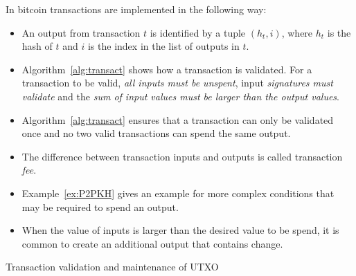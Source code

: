 \begin{note}
	\label{bitcoin:transactions}
	In bitcoin transactions are implemented in the following way:
	\begin{itemize}
		\item An output from transaction $t$ is identified by a tuple $(h_t,i)$,
		where $h_t$ is the hash of $t$ and $i$ is the index in the list of outputs in $t$.
		\item Algorithm~\ref{alg:transact} shows how a transaction is validated.
		For a transaction to be valid, \emph{all inputs must be unspent}, input \emph{signatures must validate} and the \emph{sum of input values must be larger than the  output values}.
		\item Algorithm~\ref{alg:transact} ensures that a transaction can only be validated once and no two valid transactions can spend the same output.
		\item The difference between transaction inputs and outputs is called transaction \emph{fee}.
		\item Example~\ref{ex:P2PKH} gives an example for more complex conditions that may be required to spend an output.
		\item When the value of inputs is larger than the desired value to be spend, it is common to create an additional output that contains change.
	\end{itemize}
	
\end{note}

\begin{algorithm}[h!]
	\caption{Transaction validation and maintenance of UTXO}
	\label{alg:transact}
	\begin{algorithmic}
				\EndIf
				\EndIf
			\EndFor
			\EndIf
			
				 
			\EndFor
			
			
		\EndProcedure
	\end{algorithmic}
\end{algorithm}

